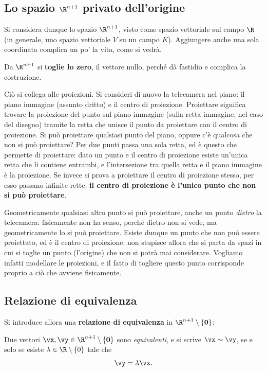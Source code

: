 \subsection{Lo spazio $\R^{n+1}$ privato dell'origine}

Si considera dunque lo spazio $\R^{n+1}$, visto come spazio vettoriale sul campo $\R$ (in generale, uno spazio vettoriale $V$ su un campo $K$). Aggiungere anche una sola coordinata complica un po' la vita, come si vedrà.

Da $\R^{n+1}$ si \textbf{toglie lo zero}, il vettore nullo, perché dà fastidio e complica la costruzione.

Ciò si collega alle proiezioni. Si consideri di nuovo la telecamera nel piano: il piano immagine (assunto dritto) e il centro di proiezione. Proiettare significa trovare la proiezione del punto sul piano immagine (sulla retta immagine, nel caso del disegno) tramite la retta che unisce il punto da proiettare con il centro di proiezione. Si può proiettare qualsiasi punto del piano, oppure c'è qualcosa che non si può proiettare? Per due punti passa una sola retta, ed è questo che permette di proiettare: dato un punto e il centro di proiezione esiste un'unica retta che li contiene entrambi, e l'intersezione tra quella retta e il piano immagine è la proiezione. Se invece si prova a proiettare il centro di proiezione stesso, per esso passano infinite rette: \textbf{il centro di proiezione è l'unico punto che non si può proiettare}.

Geometricamente qualsiasi altro punto si può proiettare, anche un punto \emph{dietro} la telecamera: fisicamente non ha senso, perché dietro non si vede, ma geometricamente lo si può proiettare. Esiste dunque un punto che non può essere proiettato, ed è il centro di proiezione: non stupisce allora che si parta da spazi in cui si toglie un punto (l'origine) che non si potrà mai considerare. Vogliamo infatti modellare le proiezioni, e il fatto di togliere questo punto corrisponde proprio a ciò che avviene fisicamente.

\subsection{Relazione di equivalenza}

Si introduce allora una \textbf{relazione di equivalenza} in $\R^{n+1}\setminus\{\mathbf{0}\}$:

\begin{definition}
Due vettori $\vx,\vy\in\R^{n+1}\setminus\{\mathbf{0}\}$ sono \emph{equivalenti}, e si scrive $\vx\sim\vy$, se e solo se esiste $\lambda\in\R\setminus\{0\}$ tale che
\[
  \vy = \lambda\vx .
\]
\end{definition}

